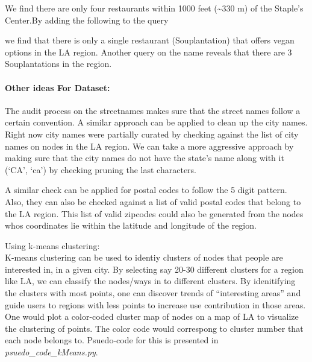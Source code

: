 \documentclass[]{article}
\newenvironment{Shaded}{\begin{snugshade}}{\end{snugshade}}
\newcommand{\StringTok}[1]{\textcolor[rgb]{0.80,0.58,0.58}{{#1}}}
\newcommand{\NormalTok}[1]{\textcolor[rgb]{0.80,0.80,0.80}{{#1}}}
\begin{document}
We find there are only four restaurants within 1000 feet
(\textasciitilde{}330 m) of the Staple's Center.By adding the following
to the query

\begin{Shaded}
\end{Shaded}

we find that there is only a single restaurant (Souplantation) that
offers vegan options in the LA region. Another query on the name reveals
that there are 3 Souplantations in the region.

\paragraph{Other ideas For Dataset:}\label{other-ideas-for-dataset}

The audit process on the streetnames makes sure that the street names
follow a certain convention. A similar approach can be applied to clean
up the city names. Right now city names were partially curated by
checking against the list of city names on nodes in the LA region. We
can take a more aggressive approach by making sure that the city names
do not have the state's name along with it (`CA', `ca') by checking
pruning the last characters.

A similar check can be applied for postal codes to follow the 5 digit
pattern. Also, they can also be checked against a list of valid postal
codes that belong to the LA region. This list of valid zipcodes could
also be generated from the nodes whos coordinates lie within the
latitude and longitude of the region.

 Using k-means clustering:\\K-means clustering can be used to identiy
clusters of nodes that people are interested in, in a given city. By
selecting say 20-30 different clusters for a region like LA, we can
classify the nodes/ways in to different clusters. By idenitifying the
clusters with most points, one can discover trends of ``interesting
areas'' and guide users to regions with less points to increase use
contribution in those areas. One would plot a color-coded cluster map of
nodes on a map of LA to visualize the clustering of points. The color
code would correspong to cluster number that each node belongs to.
Psuedo-code for this is presented in \emph{psuedo\_code\_kMeans.py}.
\end{document}
